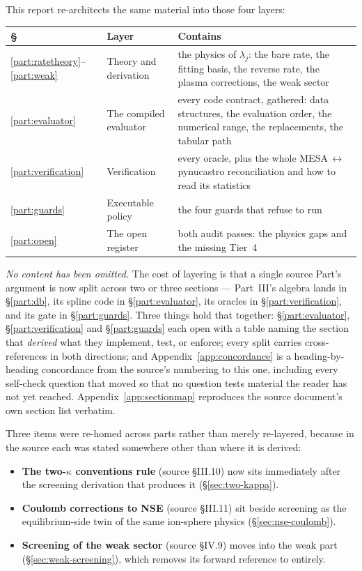 This report re-architects the same material into those four layers:

\begin{center}
\begin{tabularx}{\textwidth}{@{}L{1.5cm} L{3.5cm} Y@{}}
\toprule
\textbf{\S} & \textbf{Layer} & \textbf{Contains} \\
\midrule
\ref{part:ratetheory}--\ref{part:weak} & Theory and derivation &
  the physics of $\lambda_j$: the bare rate, the fitting basis, the reverse
  rate, the plasma corrections, the weak sector \\
\ref{part:evaluator} & The compiled evaluator &
  every code contract, gathered: data structures, the evaluation order, the
  numerical range, the replacements, the tabular path \\
\ref{part:verification} & Verification &
  every oracle, plus the whole MESA\,$\leftrightarrow$\,pynucastro
  reconciliation and how to read its statistics \\
\ref{part:guards} & Executable policy &
  the four guards that refuse to run \\
\ref{part:open} & The open register &
  both audit passes: the physics gaps and the missing Tier~4 \\
\bottomrule
\end{tabularx}
\end{center}

\emph{No content has been omitted.} The cost of layering is that a single
source Part's argument is now split across two or three sections --- Part~III's
algebra lands in \S\ref{part:db}, its spline code in \S\ref{part:evaluator},
its oracles in \S\ref{part:verification}, and its gate in \S\ref{part:guards}.
Three things hold that together: \S\ref{part:evaluator},
\S\ref{part:verification} and \S\ref{part:guards} each open with a table naming
the section that \emph{derived} what they implement, test, or enforce; every
split carries cross-references in both directions; and
Appendix~\ref{app:concordance} is a heading-by-heading concordance from the
source's numbering to this one, including every self-check question that moved
so that no question tests material the reader has not yet reached.
Appendix~\ref{app:sectionmap} reproduces the source document's own section list
verbatim.

Three items were re-homed across parts rather than merely re-layered, because
in the source each was stated somewhere other than where it is derived:

\begin{itemize}
\item \textbf{The two-$\kappa$ conventions rule} (source \S III.10) now sits
      immediately after the screening derivation that produces it
      (\S\ref{sec:two-kappa}).
\item \textbf{Coulomb corrections to NSE} (source \S III.11) sit beside
      screening as the equilibrium-side twin of the same ion-sphere physics
      (\S\ref{sec:nse-coulomb}).
\item \textbf{Screening of the weak sector} (source \S IV.9) moves into the
      weak part (\S\ref{sec:weak-screening}), which removes its forward
      reference to \muE{} entirely.
\end{itemize}

